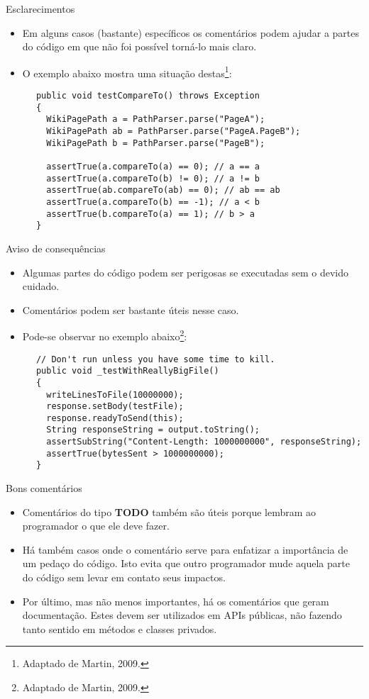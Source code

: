 \documentclass[11pt]{beamer}
\begin{document}
  \begin{frame}[fragile]{Esclarecimentos}
    \begin{itemize}
      \item Em alguns casos (bastante) específicos os comentários podem ajudar a partes do código em que não foi possível torná-lo mais claro.
      \item O exemplo abaixo mostra uma situação destas\footnote{Adaptado de Martin, 2009.}:
    \end{itemize}
    \begin{lstlisting}
      public void testCompareTo() throws Exception
      {
        WikiPagePath a = PathParser.parse("PageA");
        WikiPagePath ab = PathParser.parse("PageA.PageB");
        WikiPagePath b = PathParser.parse("PageB");
        
        assertTrue(a.compareTo(a) == 0); // a == a
        assertTrue(a.compareTo(b) != 0); // a != b
        assertTrue(ab.compareTo(ab) == 0); // ab == ab
        assertTrue(a.compareTo(b) == -1); // a < b
        assertTrue(b.compareTo(a) == 1); // b > a
      }
    \end{lstlisting}
  \end{frame}

  \begin{frame}[fragile]{Aviso de consequências}
    \begin{itemize}
      \item Algumas partes do código podem ser perigosas se executadas sem o devido cuidado.
      \item Comentários podem ser bastante úteis nesse caso.
      \item Pode-se observar no exemplo abaixo\footnote{Adaptado de Martin, 2009.}:
    \end{itemize}
    \begin{lstlisting}
      // Don't run unless you have some time to kill.
      public void _testWithReallyBigFile()
      {
        writeLinesToFile(10000000);
        response.setBody(testFile);
        response.readyToSend(this);
        String responseString = output.toString();
        assertSubString("Content-Length: 1000000000", responseString);
        assertTrue(bytesSent > 1000000000);
      }
    \end{lstlisting}
  \end{frame}

  \begin{frame}{Bons comentários}
    \begin{itemize}
      \item Comentários do tipo \textbf{TODO} também são úteis porque lembram ao programador o que ele deve fazer.
      \item Há também casos onde o comentário serve para enfatizar a importância de um pedaço do código. Isto evita que outro programador mude aquela parte do código sem levar em contato seus impactos.
      \item Por último, mas não menos importantes, há os comentários que geram documentação. Estes devem ser utilizados em APIs públicas, não fazendo tanto sentido em métodos e classes privados.
    \end{itemize}
  \end{frame}
\end{document}
